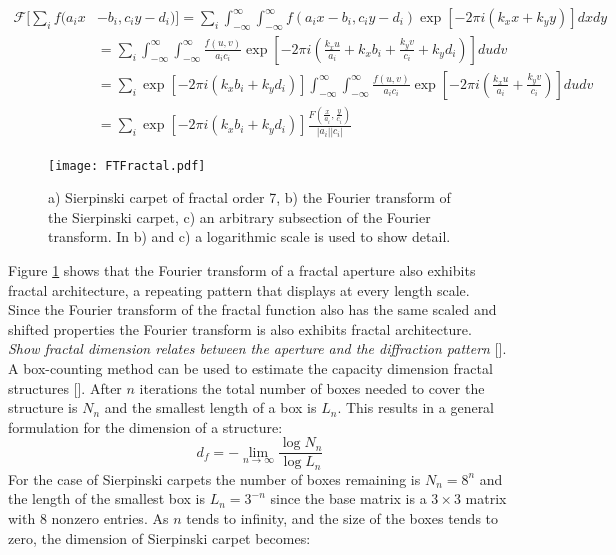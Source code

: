 \begin{equation}
\begin{split}
\mathcal{F}\Big[\sum_if(a_ix&-b_i,c_iy-d_i)\Big] = \sum_i\int_{-\infty}^{\infty}\int_{-\infty}^{\infty}f(a_ix-b_i,c_iy-d_i)\exp[-2\pi i(k_xx+k_yy)]dxdy\\
&= \sum_i\int_{-\infty}^{\infty}\int_{-\infty}^{\infty} \frac{f(u,v)}{a_ic_i}\exp[-2\pi i(\frac{k_xu}{a_i}+k_xb_i+\frac{k_yv}{c_i}+k_yd_i)]dudv\\
&=\sum_i\exp[-2\pi i(k_xb_i+k_yd_i)]\int_{-\infty}^{\infty}\int_{-\infty}^{\infty} \frac{f(u,v)}{a_ic_i}\exp[-2\pi i(\frac{k_xu}{a_i}+\frac{k_y v}{c_i})]dudv\\
&=\sum_i\exp[-2\pi i(k_xb_i+k_yd_i)]\frac{F(\frac{x}{a_i},\frac{y}{c_i})}{|a_i||c_i|}
\end{split}
\end{equation}
\begin{figure}[!ht]
\texttt{[image: FTFractal.pdf]}
\caption{a) Sierpinski carpet of fractal order 7, b) the Fourier transform of the Sierpinski carpet, c) an arbitrary subsection of the Fourier transform. In b) and c) a logarithmic scale is used to show detail.}
\label{FTFractal}
\end{figure}
 Figure \ref{FTFractal} shows that the Fourier transform of a fractal aperture also exhibits fractal architecture, a repeating pattern that displays at every length scale.\\
 Since the Fourier transform of the fractal function also has the same scaled and shifted properties the Fourier transform is also exhibits fractal architecture.\\
\textit{Show fractal dimension relates between the aperture and the diffraction pattern} [\cite{Guerin,Allain,Dubuc}].\\
A box-counting method can be used to estimate the capacity dimension fractal structures [\cite{McMullen,Sagan,Falconer}]. After $n$ iterations the total number of boxes needed to cover the structure is $N_n$ and the smallest length of a box is $L_n$. This results in a general formulation for the dimension of a structure:
\begin{equation}
 d_f = -\lim_{n\rightarrow\infty}\frac{\log N_n}{\log L_n}
\end{equation} 
For the case of Sierpinski carpets the number of boxes remaining is $N_n = 8^n$ and the length of the smallest box is $L_n = 3^{-n}$ since the base matrix is a $3\times 3$ matrix with $8$ nonzero entries. As $n$ tends to infinity, and the size of the boxes tends to zero, the dimension of Sierpinski carpet becomes:
